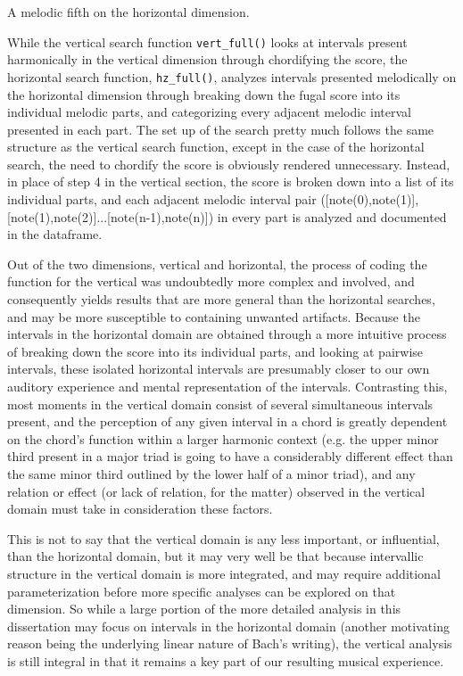 \begin{Example}[H]
\vspace{1.5em}
    \centering
    \caption{ A melodic fifth on the horizontal dimension. }
\end{Example}    
    While the vertical search function \texttt{vert\_full()} looks at
intervals present harmonically in the vertical dimension through
chordifying the score, the horizontal search function,
\texttt{hz\_full()}, analyzes intervals presented melodically on the
horizontal dimension through breaking down the fugal score into its
individual melodic parts, and categorizing every adjacent melodic
interval presented in each part. The set up of the search pretty much
follows the same structure as the vertical search function, except in
the case of the horizontal search, the need to chordify the score is
obviously rendered unnecessary. Instead, in place of step 4 in the
vertical section, the score is broken down into a list of its individual
parts, and each adjacent melodic interval pair ({[}note(0),note(1){]},
{[}note(1),note(2){]}...{[}note(n-1),note(n){]}) in every part is
analyzed and documented in the dataframe.

Out of the two dimensions, vertical and horizontal, the process of
coding the function for the vertical was undoubtedly more complex and
involved, and consequently yields results that are more general than the
horizontal searches, and may be more susceptible to containing unwanted
artifacts. Because the intervals in the horizontal domain are obtained
through a more intuitive process of breaking down the score into its
individual parts, and looking at pairwise intervals, these isolated
horizontal intervals are presumably closer to our own auditory
experience and mental representation of the intervals. Contrasting this,
most moments in the vertical domain consist of several simultaneous
intervals present, and the perception of any given interval in a chord
is greatly dependent on the chord's function within a larger harmonic
context (e.g. the upper minor third present in a major triad is going to
have a considerably different effect than the same minor third outlined
by the lower half of a minor triad), and any relation or effect (or lack
of relation, for the matter) observed in the vertical domain must take
in consideration these factors.

This is not to say that the vertical domain is any less important, or
influential, than the horizontal domain, but it may very well be that
because intervallic structure in the vertical domain is more integrated,
and may require additional parameterization before more specific
analyses can be explored on that dimension. So while a large portion of
the more detailed analysis in this dissertation may focus on intervals
in the horizontal domain (another motivating reason being the underlying
linear nature of Bach's writing), the vertical analysis is still
integral in that it remains a key part of our resulting musical
experience.


